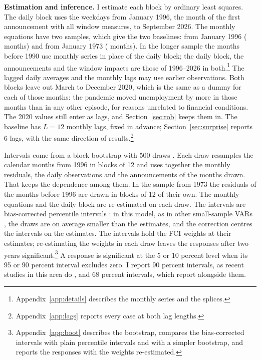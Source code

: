 \documentclass[11pt]{article}
\begin{document}
\textbf{Estimation and inference.} I estimate each block by ordinary least squares. The daily block uses the weekdays from January 1996, the month of the first announcement with all window measures, to September 2026. The monthly equations have two samples, which give the two baselines: from January 1996 ( months) and from January 1973 ( months). In the longer sample the months before 1990 use monthly series in place of the daily block; the daily block, the announcements and the window impacts are those of 1996--2026 in both.\footnote{Appendix~\ref{app:details} describes the monthly series and the splices.} The lagged daily averages and the monthly lags may use earlier observations. Both blocks leave out March to December 2020, which is the same as a dummy for each of those months: the pandemic moved unemployment by more in those months than in any other episode, for reasons unrelated to financial conditions. The 2020 values still enter as lags, and Section~\ref{sec:rob} keeps them in. The baseline has $L=12$ monthly lags, fixed in advance; Section~\ref{sec:surprise} reports 6 lags, with the same direction of results.\footnote{Appendix~\ref{app:lags} reports every case at both lag lengths.}

Intervals come from a block bootstrap with 500 draws \citep{kunsch1989,jentsch2019}. Each draw resamples the calendar months from 1996 in blocks of 12 and uses together the monthly residuals, the daily observations and the announcements of the months drawn. That keeps the dependence among them. In the sample from 1973 the residuals of the months before 1996 are drawn in blocks of 12 of their own. The monthly equations and the daily block are re-estimated on each draw. The intervals are bias-corrected percentile intervals \citep{efron1987}: in this model, as in other small-sample VARs \citep{kilian1998}, the draws are on average smaller than the estimates, and the correction centres the intervals on the estimates. The intervals hold the FCI weights at their estimates; re-estimating the weights in each draw leaves the responses after two years significant.\footnote{Appendix~\ref{app:boot} describes the bootstrap, compares the bias-corrected intervals with plain percentile intervals and with a simpler bootstrap, and reports the responses with the weights re-estimated.} A response is significant at the 5 or 10 percent level when its 95 or 90 percent interval excludes zero. I report 90 percent intervals, as recent studies in this area do \citep{bauer2023,caldara2019,miranda2021,ramey2016}, and 68 percent intervals, which \citet{jarocinski2020} report alongside them.
\end{document}
